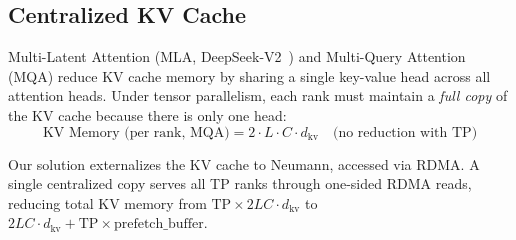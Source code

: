 \documentclass[11pt,letterpaper]{article}
\theoremstyle{definition}
\begin{document}
\begin{table}[htbp]
\centering
\caption{Thesis concepts mapped to \texttt{tensor\_rdma} modules}
\label{tab:module-mapping}
\end{table}

\subsection{Centralized KV Cache}

Multi-Latent Attention (MLA, DeepSeek-V2~\cite{deepseekv2}) and Multi-Query Attention (MQA) reduce KV cache memory by sharing a single key-value head across all attention heads. Under tensor parallelism, each rank must maintain a \emph{full copy} of the KV cache because there is only one head:
\begin{equation}
    \text{KV Memory (per rank, MQA)} = 2 \cdot L \cdot C \cdot d_{\text{kv}} \quad \text{(no reduction with TP)}
\end{equation}

Our solution externalizes the KV cache to Neumann, accessed via RDMA. A single centralized copy serves all TP ranks through one-sided RDMA reads, reducing total KV memory from $\text{TP} \times 2LC \cdot d_{\text{kv}}$ to $2LC \cdot d_{\text{kv}} + \text{TP} \times \text{prefetch\_buffer}$.
\end{document}
